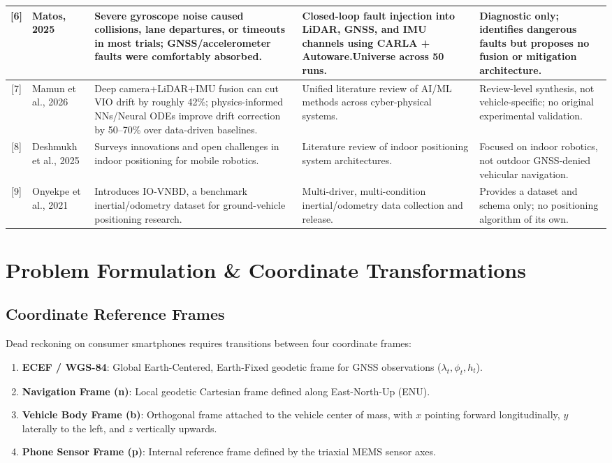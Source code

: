\documentclass[conference]{IEEEtran}
\begin{document}
\begin{table}[t]
{\begin{tabular}{|c|l|p{4.5cm}|p{4.5cm}|p{4.5cm}|}
[6] & Matos, 2025 &
Severe gyroscope noise caused collisions, lane departures, or timeouts in most trials; GNSS/accelerometer faults were comfortably absorbed. &
Closed-loop fault injection into LiDAR, GNSS, and IMU channels using CARLA + Autoware.Universe across 50 runs. &
Diagnostic only; identifies dangerous faults but proposes no fusion or mitigation architecture. \\
\hline

[7] & Mamun et al., 2026 &
Deep camera+LiDAR+IMU fusion can cut VIO drift by roughly 42\%; physics-informed NNs/Neural ODEs improve drift correction by 50--70\% over data-driven baselines. &
Unified literature review of AI/ML methods across cyber-physical systems. &
Review-level synthesis, not vehicle-specific; no original experimental validation. \\
\hline

[8] & Deshmukh et al., 2025 &
Surveys innovations and open challenges in indoor positioning for mobile robotics. &
Literature review of indoor positioning system architectures. &
Focused on indoor robotics, not outdoor GNSS-denied vehicular navigation. \\
\hline

[9] & Onyekpe et al., 2021 &
Introduces IO-VNBD, a benchmark inertial/odometry dataset for ground-vehicle positioning research. &
Multi-driver, multi-condition inertial/odometry data collection and release. &
Provides a dataset and schema only; no positioning algorithm of its own. \\
\hline

\end{tabular}%
}
\end{table}

\section{Problem Formulation \& Coordinate Transformations}

\subsection{Coordinate Reference Frames}

Dead reckoning on consumer smartphones requires transitions between four coordinate frames:

\begin{enumerate}
\item \textbf{ECEF / WGS-84}: Global Earth-Centered, Earth-Fixed geodetic frame for GNSS observations ($\lambda_t, \phi_t, h_t$).
\item \textbf{Navigation Frame (n)}: Local geodetic Cartesian frame defined along East-North-Up (ENU).
\item \textbf{Vehicle Body Frame (b)}: Orthogonal frame attached to the vehicle center of mass, with $x$ pointing forward longitudinally, $y$ laterally to the left, and $z$ vertically upwards.
\item \textbf{Phone Sensor Frame (p)}: Internal reference frame defined by the triaxial MEMS sensor axes.
\end{enumerate}
\end{document}
